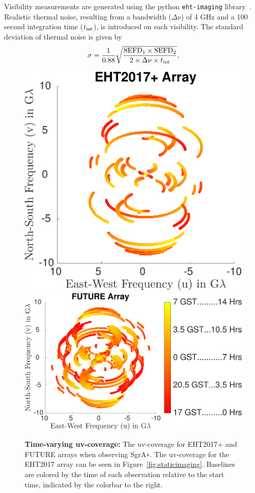 Visibility measurements are generated using the python \texttt{eht-imaging} library~\cite{andrew}. %
Realistic thermal noise, resulting from a bandwidth ($\Delta \nu$) of 4 GHz and a 100 second integration time ($t_{\rm int}$), is introduced on each visibility. The standard deviation of thermal noise is given by
\begin{align}
\sigma = \frac{1}{0.88} \sqrt{\frac{\mbox{SEFD}_1 \times \mbox{SEFD}_2 }{2 \times \Delta \nu \times t_{\rm int} } },
\label{eq:thermal}
\end{align}

\noindent{for System Equivalent Flux Density (SEFD) of the two telescopes corresponding to each visibility\footnote{The factor of 1/0.88 is due to information loss due to recording 2-bit quantized data-streams at each telescope~\cite{TMS}.}~\cite{taylor1999synthesis}.  %
Random station-based atmospheric phases drawn from a uniform distribution at each time step are introduced into measurements using the \texttt{eht-imaging} library. 
In Videos 2-4 a set of measurements is sampled every 5 minutes over a roughly 14 hour duration, resulting in 173 time steps. In Video 1 only 30 time steps are measured over a 12 hour duration. 
}


\begin{figure}[h!]
	\centering
	{\includegraphics[height=.38\linewidth]{figures/uvcoverage/uv_ehtfuture2_2.pdf}}
	{\includegraphics[height=.38\linewidth]{figures/uvcoverage/uv_ehtfuture1_2.pdf}}
	\caption{{\bf Time-varying uv-coverage:} The uv-coverage for EHT2017+ and FUTURE arrays when observing SgrA∗. The uv-coverage for the EHT2017 array can be seen in Figure~\ref{fig:staticimaging}. 
		Baselines are colored by the time of each observation relative to the start time, indicated by the colorbar to the right.}
	\label{fig:uvcov2}

\end{figure}


